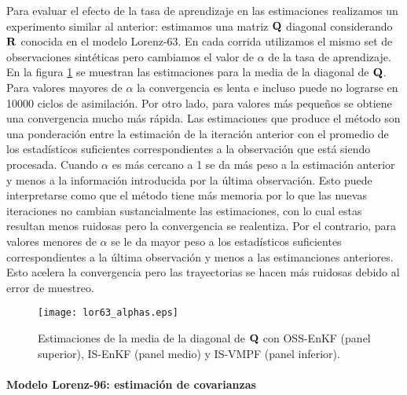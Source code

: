 Para evaluar el efecto de la tasa de aprendizaje en las estimaciones realizamos un experimento similar al anterior: estimamos una matriz $\mathbf{Q}$ diagonal considerando $\mathbf{R}$ conocida en el modelo Lorenz-63. En cada corrida utilizamos el mismo set de observaciones sintéticas pero cambiamos el valor de $\alpha$ de la tasa de aprendizaje. En la figura \ref{fig:lor63_alphas} se muestran las estimaciones para la media de la diagonal de $\mathbf{Q}$. Para valores mayores de $\alpha$ la convergencia es lenta e incluso puede no lograrse en 10000 ciclos de asimilación. Por otro lado, para valores más pequeños se obtiene una convergencia mucho más rápida. Las estimaciones que produce el método son una ponderación entre la estimación de la iteración anterior con el promedio de los estadísticos suficientes correspondientes a la observación que está siendo procesada. Cuando $\alpha$ es más cercano a 1 se da más peso a la estimación anterior y menos a la información introducida por la última observación. Esto puede interpretarse como que el método tiene más memoria por lo que las nuevas iteraciones no cambian sustancialmente las estimaciones, con lo cual estas resultan menos ruidosas pero la convergencia se realentiza. Por el contrario, para valores menores de $\alpha$ se le da mayor peso a los estadísticos suficientes correspondientes a la última observación y menos a las estimanciones anteriores. Esto acelera la convergencia pero las trayectorias se hacen más ruidosas debido al error de muestreo.
\begin{figure}[h]
    \centering
    \texttt{[image: lor63\_alphas.eps]}
    \caption{Estimaciones de la media de la diagonal de $\mathbf{Q}$ con OSS-EnKF (panel superior), IS-EnKF (panel medio) y IS-VMPF (panel inferior).}
    \label{fig:lor63_alphas}
\end{figure}

\paragraph{Modelo Lorenz-96: estimación de covarianzas} \

